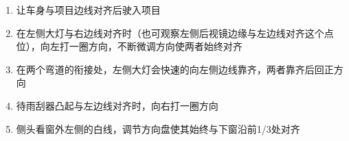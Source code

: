 \begin{enumerate}
    \item 让车身与项目边线对齐后驶入项目
    \item 在左侧大灯与右边线对齐时（也可观察左侧后视镜边缘与左边线对齐这个点位），向左打一圈方向，不断微调方向使两者始终对齐
    \item 在两个弯道的衔接处，左侧大灯会快速的向左侧边线靠齐，两者靠齐后回正方向
    \item 待雨刮器凸起与左边线对齐时，向右打一圈方向
    \item 侧头看窗外左侧的白线，调节方向盘使其始终与下窗沿前1/3处对齐
\end{enumerate}
